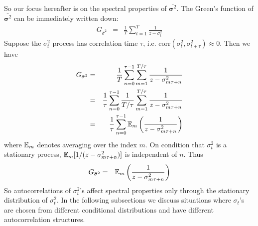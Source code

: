 \documentclass{article}
\begin{document}
So our focus hereafter is on the spectral properties of $\bar{
\bm \sigma^2}$. The Green's function of $\bar{\bm \sigma^2}$
can be immediately written down:
\begin{eqnarray*}
G_{\bar \sigma^2} &=& \frac{1}{T}\sum_{t=1}^T \frac{1}{z - \sigma_t^2}
\end{eqnarray*}
Suppose the $\sigma_t^2$ process has correlation time $\tau$,
i.e. $\text{corr}(\sigma_t^2, \sigma^2_{t+\tau}) \approx 0$. Then we
have
\begin{eqnarray*}
G_{\bar \sigma^2} &=& {1 \over T}\sum_{n=0}^{\tau-1}\sum_{m=1}^{T/\tau}
\frac{1}{z - \sigma_{m\tau + n}^2} \\
&=& {1 \over \tau}\sum_{n=0}^{\tau-1} {1 \over T/\tau}
\sum_{m=1}^{T/\tau} \frac{1}{z - \sigma_{m\tau + n}^2} \\
&=& {1 \over \tau}\sum_{n=0}^{\tau-1}
\mathbb{E}_m\left(\frac{1}{z - \sigma_{m\tau + n}^2}\right)
\end{eqnarray*}
where $\mathbb{E}_m$ denotes averaging over the index $m$. On condition that
$\sigma_t^2$ is a stationary process, $\mathbb{E}_m[1 / (z -
    \sigma_{m\tau + n}^2)]$ is independent of $n$. Thus
\begin{eqnarray}\label{eq:greens}
G_{\bar \sigma^2} &=& \mathbb{E}_m\left(
  \frac{1}{z - \sigma_{m\tau + n}^2}
\right)
\end{eqnarray}
So autocorrelations of $\sigma_t^2$'s affect spectral properties
only through the stationary distribution of $\sigma_t^2$.
In the following subsections we discuss situations where $\sigma_t$'s
are chosen from different conditional distributions and have different
autocorrelation structures.
\end{document}
